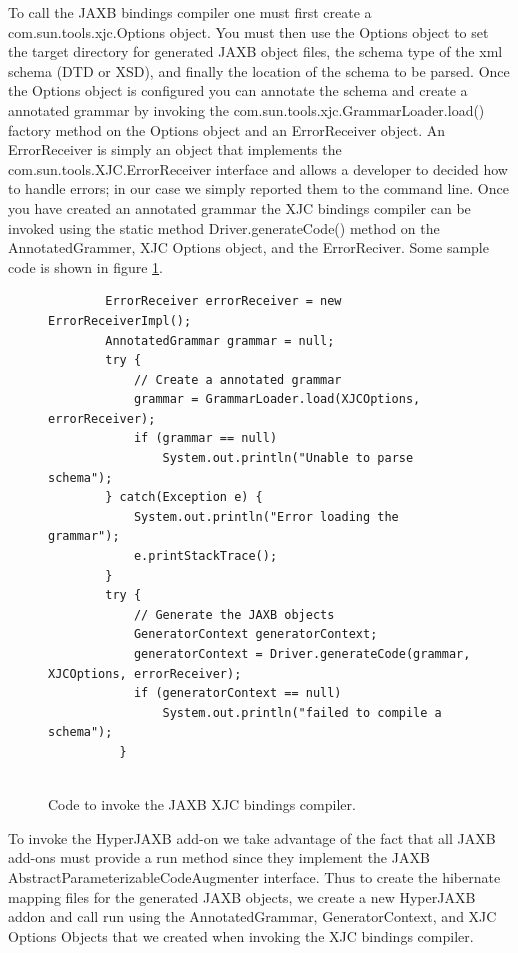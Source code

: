 To call the JAXB bindings compiler one must first create a com.sun.tools.xjc.Options object.  You must then use the Options object to set the target directory for generated JAXB object files, the schema type of the xml schema (DTD or XSD), and finally the location of the schema to be parsed.  Once the Options object is configured you can annotate the schema and create a annotated grammar by invoking the com.sun.tools.xjc.GrammarLoader.load()  factory method on the Options object and an ErrorReceiver object.  An ErrorReceiver is simply an object that implements the com.sun.tools.XJC.ErrorReceiver interface and allows a developer to decided how to handle errors;  in our case we simply reported them to the command line.   Once you have created an annotated grammar the XJC bindings compiler can be invoked using the static method Driver.generateCode() method on the AnnotatedGrammer, XJC Options object, and the ErrorReciver.  Some sample code is shown in figure \ref{XJCsamplecode}.
\begin{figure}[htbp]
\begin{center}
\begin{verbatim}     
        ErrorReceiver errorReceiver = new ErrorReceiverImpl();
        AnnotatedGrammar grammar = null;
        try {
            // Create a annotated grammar
            grammar = GrammarLoader.load(XJCOptions, errorReceiver);
            if (grammar == null)
                System.out.println("Unable to parse schema");
        } catch(Exception e) {
            System.out.println("Error loading the grammar");
            e.printStackTrace(); 
        }
        try {
            // Generate the JAXB objects
            GeneratorContext generatorContext;
            generatorContext = Driver.generateCode(grammar, XJCOptions, errorReceiver);
            if (generatorContext == null)
                System.out.println("failed to compile a schema");
          }
        
\end{verbatim}

\caption{Code to invoke the JAXB XJC bindings compiler.}
\label{XJCsamplecode}
\end{center}
\end{figure}

To invoke the HyperJAXB add-on we take advantage of the fact that all JAXB add-ons must provide a run method since they implement the JAXB AbstractParameterizableCodeAugmenter interface.  Thus to create the hibernate mapping files for the generated JAXB objects, we create a new HyperJAXB addon and call run using the AnnotatedGrammar, GeneratorContext,  and XJC Options Objects that we created when invoking the XJC bindings compiler. 

